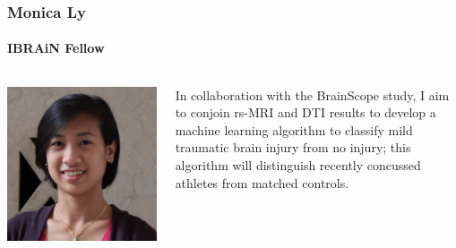 \documentclass[aspectratio=169]{beamer}
\begin{document}
\begin{frame}
	\frametitle{Monica Ly}
	\framesubtitle{IBRAiN Fellow}

	\begin{columns}[T]
		\begin{column}{.25\textwidth}
			\includegraphics[width=\textwidth]{img/ly.png}
		\end{column}

		\begin{column}{.75\textwidth}
			In collaboration with the BrainScope study, I aim to conjoin rs-MRI and DTI results to develop a machine learning algorithm to classify mild traumatic brain injury from no injury; this algorithm will distinguish recently concussed athletes from matched controls.
		\end{column}
	\end{columns}
\end{frame}
\end{document}
